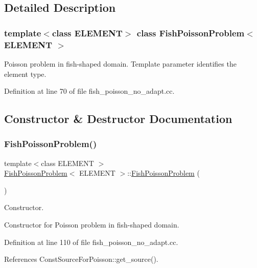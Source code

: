 \subsection{Detailed Description}
\subsubsection*{template$<$class E\+L\+E\+M\+E\+NT$>$\newline
class Fish\+Poisson\+Problem$<$ E\+L\+E\+M\+E\+N\+T $>$}

Poisson problem in fish-\/shaped domain. Template parameter identifies the element type. 

Definition at line 70 of file fish\+\_\+poisson\+\_\+no\+\_\+adapt.\+cc.



\subsection{Constructor \& Destructor Documentation}
\mbox{\label{classFishPoissonProblem_ab283ed2dc6985c2871afb09d96b0cff0}} 
\subsubsection{\texorpdfstring{Fish\+Poisson\+Problem()}{FishPoissonProblem()}}
{\footnotesize\ttfamily template$<$class E\+L\+E\+M\+E\+NT $>$ \\
\hyperlink{classFishPoissonProblem}{Fish\+Poisson\+Problem}$<$ E\+L\+E\+M\+E\+NT $>$\+::\hyperlink{classFishPoissonProblem}{Fish\+Poisson\+Problem} (\begin{DoxyParamCaption}{ }\end{DoxyParamCaption})}



Constructor. 

Constructor for Poisson problem in fish-\/shaped domain. 

Definition at line 110 of file fish\+\_\+poisson\+\_\+no\+\_\+adapt.\+cc.



References Const\+Source\+For\+Poisson\+::get\+\_\+source().

\mbox{\label{classFishPoissonProblem_ad4e0b221af80c3bcc77badc40657a385}} 
